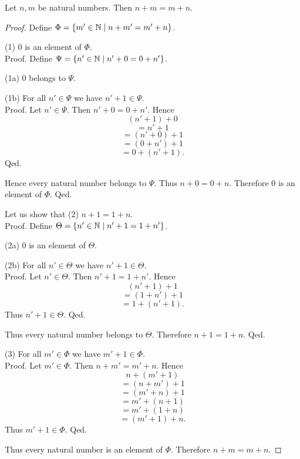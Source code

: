 \documentclass[10pt]{article}
\begin{document}
  \begin{forthel}
    \begin{proposition}
      Let $n, m$ be natural numbers.
      Then $n + m = m + n$.
    \end{proposition}
    \begin{proof}
      Define $\Phi = \{ m' \in \mathbb{N} \mid n + m' = m' + n \}$.

      (1) $0$ is an element of $\Phi$. \\
      Proof.
        Define $\Psi = \{ n' \in \mathbb{N} \mid n' + 0 = 0 + n' \}$.

        (1a) $0$ belongs to $\Psi$.

        (1b) For all $n' \in \Psi$ we have $n' + 1 \in \Psi$. \\
        Proof.
          Let $n' \in \Psi$.
          Then $n' + 0 = 0 + n'$.
          Hence
          \[  (n' + 1) + 0        \]
          \[    = n' + 1          \]
          \[    = (n' + 0) + 1    \]
          \[    = (0 + n') + 1    \]
          \[    = 0 + (n' + 1).   \]
        Qed.

        Hence every natural number belongs to $\Psi$.
        Thus $n + 0 = 0 + n$.
        Therefore $0$ is an element of $\Phi$.
      Qed.

      Let us show that (2) $n + 1 = 1 + n$. \\
      Proof.
        Define $\Theta = \{ n' \in \mathbb{N} \mid n' + 1 = 1 + n' \}$.

        (2a) $0$ is an element of $\Theta$.

        (2b) For all $n' \in \Theta$ we have $n' + 1 \in \Theta$. \\
        Proof.
          Let $n' \in \Theta$.
          Then $n' + 1 = 1 + n'$.
          Hence
          \[  (n' + 1) + 1        \]
          \[    = (1 + n') + 1    \]
          \[    = 1 + (n' + 1).   \]
          Thus $n' + 1 \in \Theta$.
        Qed.

        Thus every natural number belongs to $\Theta$.
        Therefore $n + 1 = 1 + n$.
      Qed.

      (3) For all $m' \in \Phi$ we have $m' + 1 \in \Phi$. \\
      Proof.
        Let $m' \in \Phi$.
        Then $n + m' = m' + n$.
        Hence
        \[  n + (m'  + 1)       \]
        \[    = (n + m') + 1    \]
        \[    = (m' + n) + 1    \]
        \[    = m' + (n + 1)    \]
        \[    = m' + (1 + n)    \]
        \[    = (m' + 1) + n.   \]
        Thus $m' + 1 \in \Phi$.
      Qed.

      Thus every natural number is an element of $\Phi$.
      Therefore $n + m = m + n$.
    \end{proof}
  \end{forthel}
\end{document}
